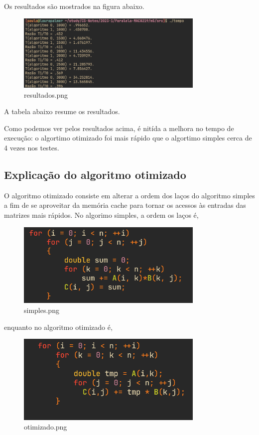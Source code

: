 \documentclass{article}
\begin{document}
Os resultados são mostrados na figura abaixo. 

\begin{figure}[htpb]
  \centering
  \includegraphics[width=0.8\textwidth]{resultados.png}
  \caption{resultados.png}
  \label{fig:resultados-png}
\end{figure}

A tabela abaixo resume os resultados.

Como podemos ver pelos resultados acima, é nitída a melhora no tempo de execução: o algortimo otimizado foi mais rápido que o algortimo simples cerca de 4 vezes nos testes.

\subsection{Explicação do algoritmo otimizado}

O algoritmo otimizado consiste em alterar a ordem dos laços do algoritmo simples a fim de se aproveitar da memória cache para tornar os acessos às entradas das matrizes mais rápidos. No algorimo simples, a ordem os laços é,

\begin{figure}[htpb]
  \centering
  \includegraphics[width=0.8\textwidth]{simples.png}
  \caption{simples.png}
  \label{fig:simples-png}
\end{figure}

enquanto no algoritmo otimizado é,


\begin{figure}[htpb]
  \centering
  \includegraphics[width=0.8\textwidth]{otimizado.png}
  \caption{otimizado.png}
  \label{fig:otimizado-png}
\end{figure}
\end{document}
